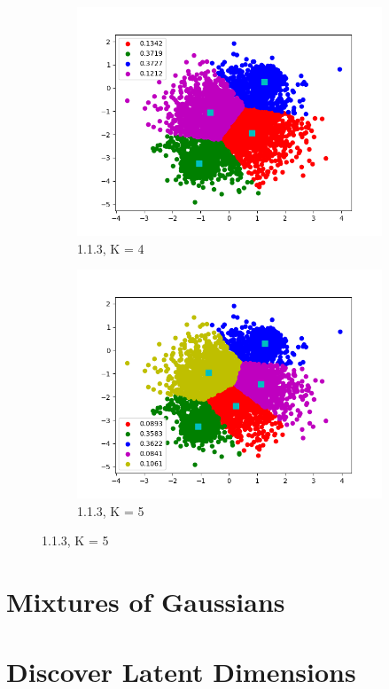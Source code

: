\documentclass[12pt,letterpaper]{article}
\begin{document}
\begin{figure}
    \begin{subfigure}[b]{0.45\textwidth}
        \includegraphics[width=\textwidth]{imgs/kmeans_K_4.png}
        \caption{1.1.3, K = 4}
    \end{subfigure}
    \begin{subfigure}[b]{0.45\textwidth}
        \includegraphics[width=\textwidth]{imgs/kmeans_K_5.png}
        \caption{1.1.3, K = 5}
    \end{subfigure}
\end{figure}

\section{Mixtures of Gaussians}


\section{Discover Latent Dimensions}
\end{document}
